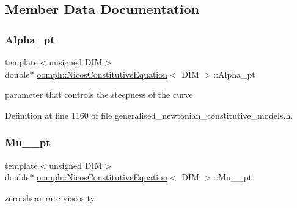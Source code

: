 \subsection{Member Data Documentation}
\mbox{\label{classoomph_1_1NicosConstitutiveEquation_aa9b410ec3ce0abdc60a86b13da0f7e95}} 
\subsubsection{\texorpdfstring{Alpha\+\_\+pt}{Alpha\_pt}}
{\footnotesize\ttfamily template$<$unsigned D\+IM$>$ \\
double$\ast$ \hyperlink{classoomph_1_1NicosConstitutiveEquation}{oomph\+::\+Nicos\+Constitutive\+Equation}$<$ D\+IM $>$\+::Alpha\+\_\+pt\hspace{0.3cm}{\ttfamily [private]}}



parameter that controls the steepness of the curve 



Definition at line 1160 of file generalised\+\_\+newtonian\+\_\+constitutive\+\_\+models.\+h.

\mbox{\label{classoomph_1_1NicosConstitutiveEquation_a47ddb3294d11f24f639796b1d8e60eac}} 
\subsubsection{\texorpdfstring{Mu\+\_\+\_\+pt}{Mu\_0\_pt}}
{\footnotesize\ttfamily template$<$unsigned D\+IM$>$ \\
double$\ast$ \hyperlink{classoomph_1_1NicosConstitutiveEquation}{oomph\+::\+Nicos\+Constitutive\+Equation}$<$ D\+IM $>$\+::Mu\+\_\+\_\+pt\hspace{0.3cm}{\ttfamily [private]}}



zero shear rate viscosity 



